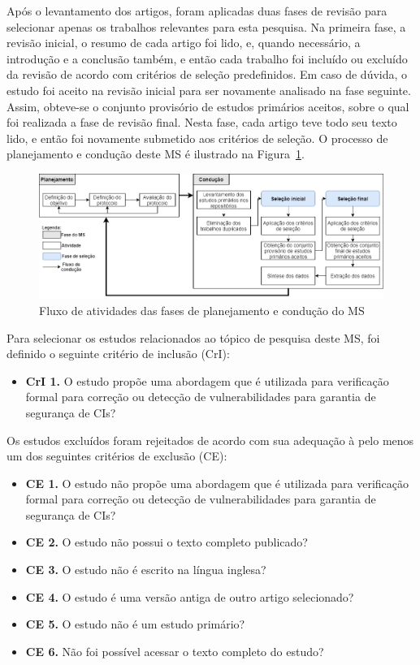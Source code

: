 Após o levantamento dos artigos, foram aplicadas duas fases de revisão para selecionar apenas os trabalhos relevantes para esta pesquisa. Na primeira fase, a revisão inicial, o resumo de cada artigo foi lido, e, quando necessário, a introdução e a conclusão também, e então cada trabalho foi incluído ou excluído da revisão de acordo com critérios de seleção predefinidos. Em caso de dúvida, o estudo foi aceito na revisão inicial para ser novamente analisado na fase seguinte. Assim, obteve-se o conjunto provisório de estudos primários aceitos, sobre o qual foi realizada a fase de revisão final. Nesta fase, cada artigo teve todo seu texto lido, e então foi novamente submetido aos critérios de seleção. O processo de planejamento e condução deste MS é ilustrado na Figura~\ref{fig:ms_fluxo}.

\begin{figure}[!ht]
 \caption{Fluxo de atividades das fases de planejamento e condução do MS}
 \label{fig:ms_fluxo}
 \centering
 \includegraphics[scale=0.5]{figuras/ms_fluxo.png}
 \fautor
\end{figure}

Para selecionar os estudos relacionados ao tópico de pesquisa deste MS, foi definido o seguinte critério de inclusão (CrI):

\begin{itemize}
    \item \textbf{CrI 1.} O estudo propõe uma abordagem que é utilizada para verificação formal para correção ou detecção de vulnerabilidades para garantia de segurança de CIs?
\end{itemize}

Os estudos excluídos foram rejeitados de acordo com sua adequação à pelo menos um dos seguintes critérios de exclusão (CE): 

\begin{itemize}
    \item \textbf{CE 1.} O estudo não propõe uma abordagem que é utilizada para verificação formal para correção ou detecção de vulnerabilidades para garantia de segurança de CIs?
    \item \textbf{CE 2.} O estudo não possui o texto completo publicado?
    \item \textbf{CE 3.} O estudo não é escrito na língua inglesa?
    \item \textbf{CE 4.} O estudo é uma versão antiga de outro artigo selecionado?
    \item \textbf{CE 5.} O estudo não é um estudo primário?
    \item \textbf{CE 6.} Não foi possível acessar o texto completo do estudo?
\end{itemize}


